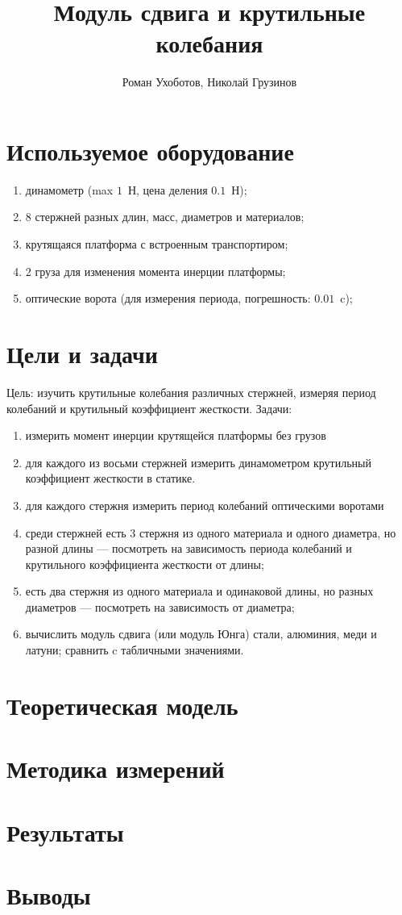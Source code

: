 \documentclass[a4paper, 12pt]{article}
\title{Модуль сдвига и крутильные колебания}
\author{Роман Ухоботов, Николай Грузинов}
\date{}%
\begin{document}
\maketitle

\section{Используемое оборудование}
\begin{enumerate}
\item динамометр (max $1$~Н, цена деления $0.1$~Н);
\item 8 стержней разных длин, масс, диаметров и материалов;
\item крутящаяся платформа с встроенным транспортиром;
\item 2 груза для изменения момента инерции платформы;
\item оптические ворота (для измерения периода, погрешность: $0.01$~c);
\end{enumerate}

\section{Цели и задачи}
Цель: изучить крутильные колебания различных стержней, измеряя период колебаний и крутильный коэффициент жесткости.
Задачи:
\begin{enumerate}
\item измерить момент инерции крутящейся платформы без грузов
\item для каждого из восьми стержней измерить динамометром крутильный коэффициент жесткости в статике.
\item для каждого стержня измерить период колебаний оптическими воротами
\item среди стержней есть 3 стержня из одного материала и одного диаметра, но разной длины --- посмотреть на зависимость периода колебаний и крутильного коэффициента жесткости от длины;
\item есть два стержня из одного материала и одинаковой длины, но разных диаметров --- посмотреть на зависимость от диаметра;
\item вычислить модуль сдвига (или модуль Юнга) стали, алюминия, меди и латуни; сравнить c табличными значениями. 
\end{enumerate}

\section{Теоретическая модель}
\section{Методика измерений}
\section{Результаты}
\section{Выводы}
\end{document}

